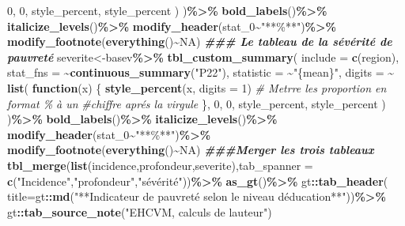 \documentclass[
]{article}
\newenvironment{Shaded}{\begin{snugshade}}{\end{snugshade}}
\newcommand{\AttributeTok}[1]{\textcolor[rgb]{0.13,0.29,0.53}{#1}}
\newcommand{\CommentTok}[1]{\textcolor[rgb]{0.56,0.35,0.01}{\textit{#1}}}
\newcommand{\ConstantTok}[1]{\textcolor[rgb]{0.56,0.35,0.01}{#1}}
\newcommand{\ControlFlowTok}[1]{\textcolor[rgb]{0.13,0.29,0.53}{\textbf{#1}}}
\newcommand{\DecValTok}[1]{\textcolor[rgb]{0.00,0.00,0.81}{#1}}
\newcommand{\DocumentationTok}[1]{\textcolor[rgb]{0.56,0.35,0.01}{\textbf{\textit{#1}}}}
\newcommand{\FunctionTok}[1]{\textcolor[rgb]{0.13,0.29,0.53}{\textbf{#1}}}
\newcommand{\NormalTok}[1]{#1}
\newcommand{\OtherTok}[1]{\textcolor[rgb]{0.56,0.35,0.01}{#1}}
\newcommand{\SpecialCharTok}[1]{\textcolor[rgb]{0.81,0.36,0.00}{\textbf{#1}}}
\newcommand{\StringTok}[1]{\textcolor[rgb]{0.31,0.60,0.02}{#1}}
\begin{document}
\begin{Shaded}
\begin{Highlighting}[]
      \DecValTok{0}\NormalTok{, }\DecValTok{0}\NormalTok{, style\_percent, style\_percent}
\NormalTok{    )}
\NormalTok{)}\SpecialCharTok{\%\textgreater{}\%}
  \FunctionTok{bold\_labels}\NormalTok{()}\SpecialCharTok{\%\textgreater{}\%} 
  \FunctionTok{italicize\_levels}\NormalTok{()}\SpecialCharTok{\%\textgreater{}\%} 
  \FunctionTok{modify\_header}\NormalTok{(stat\_0}\SpecialCharTok{\textasciitilde{}}\StringTok{"**\%**"}\NormalTok{)}\SpecialCharTok{\%\textgreater{}\%}
  \FunctionTok{modify\_footnote}\NormalTok{(}\FunctionTok{everything}\NormalTok{()}\SpecialCharTok{\textasciitilde{}}\ConstantTok{NA}\NormalTok{)}
\DocumentationTok{\#\#\# Le tableau de la sévérité de pauvreté}
\NormalTok{severite}\OtherTok{\textless{}{-}}\NormalTok{basev}\SpecialCharTok{\%\textgreater{}\%}
  \FunctionTok{tbl\_custom\_summary}\NormalTok{(}
  \AttributeTok{include =} \FunctionTok{c}\NormalTok{(region),}
  \AttributeTok{stat\_fns =} \SpecialCharTok{\textasciitilde{}}\FunctionTok{continuous\_summary}\NormalTok{(}\StringTok{"P22"}\NormalTok{),}
  \AttributeTok{statistic =} \SpecialCharTok{\textasciitilde{}}\StringTok{"\{mean\}"}\NormalTok{,}
  \AttributeTok{digits =} \SpecialCharTok{\textasciitilde{}} \FunctionTok{list}\NormalTok{(}
      \ControlFlowTok{function}\NormalTok{(x) \{}
        \FunctionTok{style\_percent}\NormalTok{(x, }\AttributeTok{digits =} \DecValTok{1}\NormalTok{) }
        \CommentTok{\# Metrre les proportion en format \% à un }
        \CommentTok{\#chiffre aprés la virgule}
\NormalTok{      \},}
      \DecValTok{0}\NormalTok{, }\DecValTok{0}\NormalTok{, style\_percent, style\_percent}
\NormalTok{    )}
\NormalTok{)}\SpecialCharTok{\%\textgreater{}\%}
  \FunctionTok{bold\_labels}\NormalTok{()}\SpecialCharTok{\%\textgreater{}\%} 
  \FunctionTok{italicize\_levels}\NormalTok{()}\SpecialCharTok{\%\textgreater{}\%} 
  \FunctionTok{modify\_header}\NormalTok{(stat\_0}\SpecialCharTok{\textasciitilde{}}\StringTok{"**\%**"}\NormalTok{)}\SpecialCharTok{\%\textgreater{}\%}
  \FunctionTok{modify\_footnote}\NormalTok{(}\FunctionTok{everything}\NormalTok{()}\SpecialCharTok{\textasciitilde{}}\ConstantTok{NA}\NormalTok{)}
\DocumentationTok{\#\#\#Merger les trois tableaux}
\FunctionTok{tbl\_merge}\NormalTok{(}\FunctionTok{list}\NormalTok{(incidence,profondeur,severite),}\AttributeTok{tab\_spanner =} 
            \FunctionTok{c}\NormalTok{(}\StringTok{"Incidence"}\NormalTok{,}\StringTok{"profondeur"}\NormalTok{,}\StringTok{"sévérité"}\NormalTok{))}\SpecialCharTok{\%\textgreater{}\%}
  \FunctionTok{as\_gt}\NormalTok{()}\SpecialCharTok{\%\textgreater{}\%}
\NormalTok{  gt}\SpecialCharTok{::}\FunctionTok{tab\_header}\NormalTok{(}
    \AttributeTok{title=}\NormalTok{gt}\SpecialCharTok{::}\FunctionTok{md}\NormalTok{(}\StringTok{"**Indicateur de pauvreté selon le niveau }
\StringTok{                 d\textquotesingle{}éducation**"}\NormalTok{))}\SpecialCharTok{\%\textgreater{}\%}
\NormalTok{  gt}\SpecialCharTok{::}\FunctionTok{tab\_source\_note}\NormalTok{(}\StringTok{"EHCVM, calculs de l\textquotesingle{}auteur"}\NormalTok{)}
\end{Highlighting}
\end{Shaded}
\end{document}
